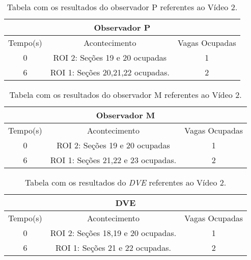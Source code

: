 \begin{table}[H]
\begin{center}
\begin{tabular}{|c||c||c|}
\hline
\multicolumn{3}{|c|}{Observador P}  \\ \hline \hline
Tempo(s) & Acontecimento & Vagas Ocupadas\\ \hline
0 & ROI 2: Seções 19 e 20 ocupadas  & 1\\ \hline
6 & ROI 1: Seções 20,21,22 ocupadas. & 2 \\
\hline
\end{tabular}
\end{center}
\caption{Tabela com os resultados do observador P referentes ao Vídeo 2.}
\label{tab:video2M}
\end{table}


\begin{table}[H]
\begin{center}
\begin{tabular}{|c||c||c|}
\hline
\multicolumn{3}{|c|}{Observador M}  \\ \hline \hline
Tempo(s) & Acontecimento & Vagas Ocupadas\\ \hline
0 & ROI 2: Seções 19 e 20 ocupadas & 1\\ \hline
6 & ROI 1: Seções 21,22 e 23 ocupadas. & 2\\
\hline
\end{tabular}
\end{center}
\caption{Tabela com os resultados do observador M referentes ao Vídeo 2.}
\label{tab:video2P}
\end{table}


\begin{table}[H]
\begin{center}
\begin{tabular}{|c||c||c|}
\hline
\multicolumn{3}{|c|}{DVE}  \\ \hline \hline
Tempo(s) & Acontecimento & Vagas Ocupadas\\ \hline
0 & ROI 2: Seções 18,19 e 20 ocupadas. & 1 \\ \hline
6 & ROI 1: Seções 21 e 22 ocupadas. & 2 \\
\hline
\end{tabular}
\end{center}
\caption{Tabela com os resultados do \textit{DVE} referentes ao Vídeo 2.}
\label{tab:video2}
\end{table}


